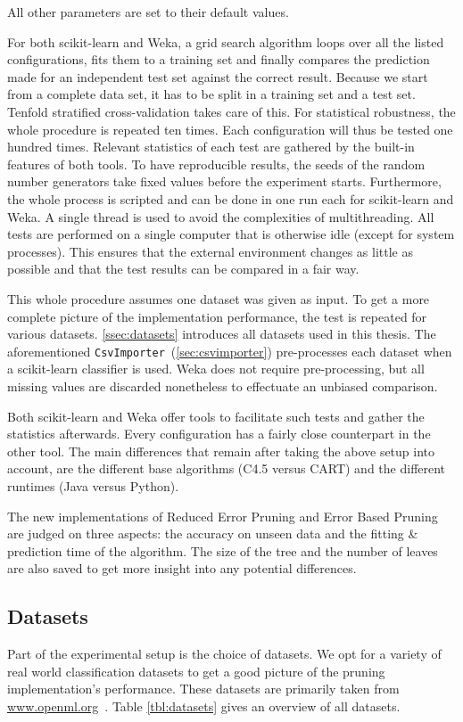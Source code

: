 All other parameters are set to their default values.

For both scikit-learn and Weka, a grid search algorithm loops over all the listed configurations, fits them to a training set and finally compares the prediction made for an independent test set against the correct result. Because we start from a complete data set, it has to be split in a training set and a test set. Tenfold stratified cross-validation takes care of this. For statistical robustness, the whole procedure is repeated ten times. Each configuration will thus be tested one hundred times. Relevant statistics of each test are gathered by the built-in features of both tools. To have reproducible results, the seeds of the random number generators take fixed values before the experiment starts. Furthermore, the whole process is scripted and can be done in one run each for scikit-learn and Weka. A single thread is used to avoid the complexities of multithreading. All tests are performed on a single computer that is otherwise idle (except for system processes). This ensures that the external environment changes as little as possible and that the test results can be compared in a fair way.

This whole procedure assumes one dataset was given as input. To get a more complete picture of the implementation performance, the test is repeated for various datasets. \autoref{ssec:datasets} introduces all datasets used in this thesis. The aforementioned \texttt{CsvImporter}~(\autoref{sec:csvimporter}) pre-processes each dataset when a scikit-learn classifier is used. Weka does not require pre-processing, but all missing values are discarded nonetheless to effectuate an unbiased comparison.

Both scikit-learn and Weka offer tools to facilitate such tests and gather the statistics afterwards. Every configuration has a fairly close counterpart in the other tool. The main differences that remain after taking the above setup into account, are the different base algorithms (C4.5 versus CART) and the different runtimes (Java versus Python).

The new implementations of Reduced Error Pruning and Error Based Pruning are judged on three aspects: the accuracy on unseen data and the fitting \& prediction time of the algorithm. The size of the tree and the number of leaves are also saved to get more insight into any potential differences.

\subsection{Datasets}
\label{ssec:datasets}
Part of the experimental setup is the choice of datasets. We opt for a variety of real world classification datasets to get a good picture of the pruning implementation's performance. These datasets are primarily taken from \url{www.openml.org}~\cite{openml}. Table \ref{tbl:datasets} gives an overview of all datasets.

